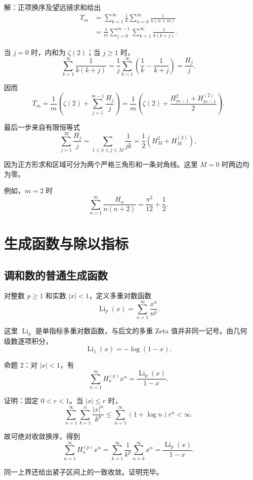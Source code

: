 \documentclass[11pt,a4paper]{article}
\newenvironment{statementblock}{\par\Needspace{9\baselineskip}\noindent}{\par\nopagebreak[4]}
\newenvironment{proofblock}{\par\Needspace{4\baselineskip}\noindent}{\par}
\begin{document}
\noindent

解：正项换序及望远镜求和给出
\[
\begin{aligned}
T_m
&=\sum_{k=1}^{\infty}\frac1k
  \sum_{n=k}^{\infty}\frac1{n(n+m)}\\
&=\frac1m\sum_{j=0}^{m-1}
  \sum_{k=1}^{\infty}\frac1{k(k+j)}.
\end{aligned}
\]

当 \(j=0\) 时，内和为 \(\zeta(2)\)；当 \(j\geqslant1\) 时，
\[
\sum_{k=1}^{\infty}\frac1{k(k+j)}
=\frac1j\sum_{k=1}^{\infty}
\left(\frac1k-\frac1{k+j}\right)
=\frac{H_j}{j}.
\]

因而
\[
T_m=\frac1m\left(\zeta(2)+\sum_{j=1}^{m-1}\frac{H_j}{j}\right)
=\frac1m\left(\zeta(2)+\frac{H_{m-1}^2+H_{m-1}^{(2)}}2\right).
\]

最后一步来自有限恒等式
\[
\sum_{j=1}^{M}\frac{H_j}{j}
=\sum_{1\leqslant k\leqslant j\leqslant M}\frac1{jk}
=\frac12\left(H_M^2+H_M^{(2)}\right),
\]

因为正方形求和区域可分为两个严格三角形和一条对角线。这里 \(M=0\) 时两边均为零。

例如，\(m=2\) 时
\[
\sum_{n=1}^{\infty}\frac{H_n}{n(n+2)}
=\frac{\pi^2}{12}+\frac12.
\]

\hypertarget{sec-4}{%
\section{生成函数与除以指标}\label{sec-4}}

\hypertarget{sec-4-1}{%
\subsection{调和数的普通生成函数}\label{sec-4-1}}

对整数 \(p\geqslant1\) 和实数 \(|x|<1\)，定义多重对数函数
\[
\operatorname{Li}_p(x)=\sum_{n=1}^{\infty}\frac{x^n}{n^p}.
\]

这里 \(\operatorname{Li}_p\) 是单指标多重对数函数，与后文的多重 Zeta 值并非同一记号。由几何级数逐项积分，
\[
\operatorname{Li}_1(x)=-\log(1-x).
\]

\begin{statementblock}

命题 2：对 \(|x|<1\)，有
\[
\sum_{n=1}^{\infty}H_n^{(p)}x^n
=\frac{\operatorname{Li}_p(x)}{1-x}.
\]

\end{statementblock}

\begin{proofblock}

证明：固定 \(0<r<1\)。当 \(|x|\leqslant r\) 时，
\[
\sum_{n=1}^{\infty}\sum_{k=1}^{n}\frac{|x|^n}{k^p}
\leqslant\sum_{n=1}^{\infty}(1+\log n)r^n<\infty.
\]

故可绝对收敛换序，得到
\[
\sum_{n=1}^{\infty}H_n^{(p)}x^n
=\sum_{k=1}^{\infty}\frac1{k^p}\sum_{n=k}^{\infty}x^n
=\frac{\operatorname{Li}_p(x)}{1-x}.
\]

同一上界还给出紧子区间上的一致收敛。证明完毕。

\end{proofblock}
\end{document}
